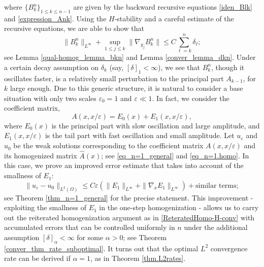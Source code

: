 \documentclass[reqno,12pt]{amsart} %
\theoremstyle{definition}
\theoremstyle{remark}
\numberwithin{equation}{section}
\newcommand{\e}{\varepsilon}
\begin{document}
where $\{B^n_k\}_{1\le k \le n-1}$ are given by the backward recursive equations \eqref{iden_Blk} and \eqref{expression_Ank}. Using the $H$-stability and a careful estimate of the recursive equations, we are able to show that 
\begin{equation*}
    \| B^n_k \|_{L^\infty} + \sup_{1\le j\le k}\| \nabla_{y_j} B^n_k \| \le C \sum_{\ell = k}^n \delta_\ell;
\end{equation*}
see Lemma \ref{qual-homog_lemma_bkn} and Lemma \ref{conver_lemma_dkn}.
Under a certain decay assumption on $\delta_k$ (say, $[\delta]_{1} < \infty$), we see that $B^n_k$, though it oscillates faster, is a relatively small perturbation to the principal part $A_{k-1}$, for $k$ large enough. Due to this generic structure, it is natural to consider a base situation with only two scales $\e_0 = 1$ and $\e \ll 1$. In fact, we consider the coefficient matrix,
\begin{equation*}
    A(x, x/\e) = E_0(x) + E_1(x,x/\e),
\end{equation*}
where $E_0(x)$ is the principal part with slow oscillation and large amplitude, and $E_1(x,x/\e)$ is the tail part with fast oscillation and small amplitude. Let $u_\e$ and $u_0$ be the weak solutions corresponding to the coefficient matrix $A(x,x/\e)$ and its homogenized matrix $\widehat{A}(x)$; see \eqref{eq_n=1_general} and \eqref{eq_n=1.homo}. In this case, we prove an improved error estimate that takes into account of the smallness of $E_1$:
\begin{equation*}
    \| u_\e - u_0 \|_{L^2(\Omega)} \le C \e (\| E_1 \|_{L^\infty} + \| \nabla_x E_1 \|_{L^\infty}) + \text{similar terms};
\end{equation*}
see Theorem \ref{thm_n=1_general} for the precise statement.
This improvement - exploiting the smallness of $E_1$
  in the one-step homogenization - allows us to carry out the reiterated homogenization argument as in  \eqref{ReteratedHomo-H-conv} with accumulated errors that can be controlled uniformly in $n$ under the additional assumption $[\delta]_{\alpha} <\infty$ for some $\alpha > 0$; see Theorem \ref{conver_thm_rate_suboptimal}. It turns out that the optimal $L^2$ convergence rate can be derived if $\alpha = 1$,  as in Theorem \ref{thm.L2rates}.

\end{document}
